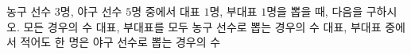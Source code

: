 \hspace*{2mm}\begin{minipage}[t]{\dimexpr\linewidth-2mm\relax}\vspace{0pt}
농구 선수 $3$명, 야구 선수 $5$명 중에서 대표 $1$명, 부대표 $1$명을 뽑을 때, 다음을 구하시오.
 모든 경우의 수
 대표, 부대표를 모두 농구 선수로 뽑는 경우의 수
 대표, 부대표 중에서 적어도 한 명은 야구 선수로 뽑는 경우의 수\end{minipage}
